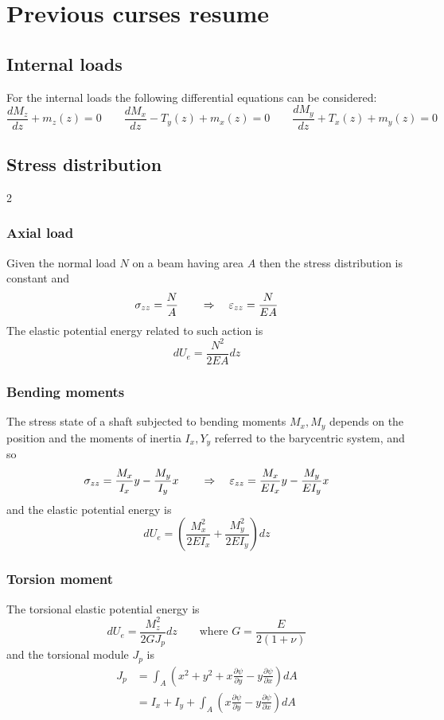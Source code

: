 \section{Previous curses resume}
\subsection{Internal loads}
	For the internal loads the following differential equations can be considered:
	\[ \frac{dM_z}{dz} + m_z(z) = 0 \qquad \frac{dM_x}{dz} -T_y(z) + m_x(z) = 0 \qquad \frac{dM_y}{dz}  + T_x(z) + m_y(z) = 0  \]

\subsection{Stress distribution}
\begin{multicols}2
\subsubsection{Axial load}
	Given the normal load $N$ on a beam having area $A$ then the stress distribution is constant and
	\[\sigma_{zz} = \frac N A \qquad \Rightarrow \quad \varepsilon_{zz} = \frac{N}{EA}\]
	The elastic potential energy related to such action is
	\[dU_e = \frac{N^2}{2EA} dz\]
\subsubsection{Bending moments}
	The stress  state of a shaft subjected to bending moments $M_x,M_y$ depends on the position and the moments of inertia $I_x,Y_y$ referred to the barycentric system, and so
	\[ \sigma_{zz} = \frac{M_x}{I_x} y - \frac{M_y}{I_y}x \qquad \Rightarrow \quad \varepsilon_{zz} = \frac{M_x} {EI_x} y - \frac{M_y}{EI_y}x \]
	and the elastic potential energy is
	\[ dU_e = \left( \frac{M_x^2}{2EI_x} + \frac{M_y^2}{2E I_y} \right)dz \]
	
\subsubsection{Torsion moment}
	The torsional elastic potential energy is
	\[ dU_e = \frac{M_z^2}{2GJ_p} dz \qquad \textrm{where } G = \frac{E}{2(1+\nu)} \]	
	and the torsional module $J_p$ is
	\begin{align*}
		J_p & = \int_A \left( x^2 + y^2 + x \frac{\partial \psi}{\partial y} - y \frac{\partial \psi}{\partial x} \right) dA \\ & = I_x + I_y + \int_A \left(	 x \frac{\partial \psi}{\partial y} - y \frac{\partial \psi}{\partial x} \right) dA
	\end{align*}
	

\end{multicols}

